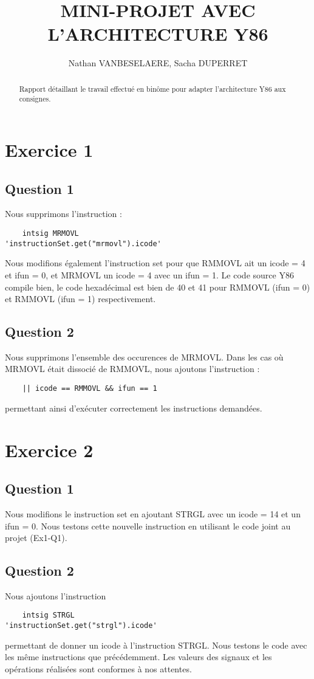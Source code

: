 \documentclass[a4paper,10pt]{article}
\title{MINI-PROJET AVEC L'ARCHITECTURE Y86}
\author{Nathan VANBESELAERE, Sacha DUPERRET}
\begin{document}
\maketitle

\begin{abstract}
Rapport détaillant le travail effectué en binôme pour adapter l'architecture Y86 aux consignes.
\end{abstract}

\tableofcontents

\section{Exercice 1}
\subsection{Question 1}

Nous supprimons l'instruction :
\begin{verbatim}
    intsig MRMOVL                   'instructionSet.get("mrmovl").icode'
\end{verbatim}
Nous modifions également l'instruction set pour que RMMOVL ait un icode = 4 et ifun = 0, et MRMOVL un icode = 4 avec un ifun = 1.
Le code source Y86 compile bien, le code hexadécimal est bien de 40 et 41 pour RMMOVL (ifun = 0) et RMMOVL (ifun = 1) respectivement.

\subsection{Question 2}
Nous supprimons l'ensemble des occurences de MRMOVL.
Dans les cas où MRMOVL était dissocié de RMMOVL, nous ajoutons l'instruction :
\begin{verbatim}
    || icode == RMMOVL && ifun == 1
\end{verbatim}
permettant ainsi d'exécuter correctement les instructions demandées.

\section{Exercice 2}
\subsection{Question 1}
Nous modifions le instruction set en ajoutant STRGL avec un icode = 14 et un ifun = 0.
Nous testons cette nouvelle instruction en utilisant le code joint au projet (Ex1-Q1).
\subsection{Question 2}
Nous ajoutons l'instruction
\begin{verbatim}
    intsig STRGL                     'instructionSet.get("strgl").icode'
\end{verbatim}
permettant de donner un icode à l'instruction STRGL.
Nous testons le code avec les même instructions que précédemment. Les valeurs des signaux et les opérations réalisées sont conformes à nos attentes.
\end{document}
